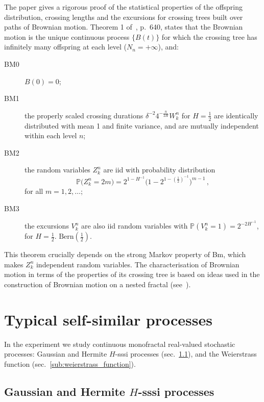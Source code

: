 \documentclass[a4paper]{article}
\newcommand{\pr}{\mathbb{P}}
\begin{document}
The paper \cite{ECP1673} gives a rigorous proof of the statistical properties of
the offspring distribution, crossing lengths and the excursions for crossing trees
built over paths of Brownian motion. Theorem 1 of~\cite{ECP1673}, p.~640, states
that the Brownian motion is the unique continuous process $\{B(t)\}$ for which the
crossing tree has infinitely many offspring at each level ($N_n = +\infty$), and:
\begin{description}
    \item[BM0] $B(0) = 0$;
    \item[BM1] the properly scaled crossing durations $\delta^{-2} 4^{-\frac{n}{2H}} W_k^n$
    for $H = \tfrac{1}{2}$ are identically distributed with mean 1 and finite variance,
    and are mutually independent within each level $n$;
    \item[BM2] the random variables $Z_k^n$ are iid with probability distribution
    \[ \pr\bigl(Z_k^n=2m\bigr) = 2^{1-H^{-1}}\bigl(1-2^{1-(\frac{1}{2})^{-1}}\bigr)^{m-1} \,,\]
    for all $m=1,2,\ldots$;
    \item[BM3] the excursions $V_k^n$ are also iid random variables with 
    $\pr( V_k^n = 1 ) = 2^{-2H^{-1}}$, for $H = \tfrac{1}{2}$.
    $\text{Bern}(\tfrac{1}{2})$.
\end{description}
This theorem crucially depends on the strong Markov property of Bm, which makes $Z_k^n$
independent random variables. The characterisation of Brownian motion in terms of
the properties of its crossing tree is based on ideas used in the construction of
Brownian motion on a nested fractal (see~\cite{BarlowPerkins88}).



\section{Typical self-similar processes} %
\label{sec:self_sim_processes}

In the experiment we study continuous monofractal real-valued stochastic processes:
Gaussian and Hermite $H$-sssi processes (sec.~\ref{sub:h_sssi_proc}), and the Weierstrass
function (sec.~\ref{sub:weierstrass_function}).

\subsection{Gaussian and Hermite $H$-sssi processes} %
\label{sub:h_sssi_proc}
\end{document}
